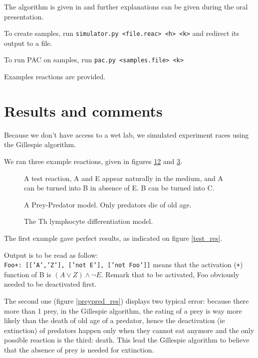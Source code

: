 \documentclass[fontsize=9pt,enabledeprecatedfontcommands]{scrartcl}
\begin{document}
The algorithm is given in \cite{valiant} and further explanations can be given during the oral presentation.

To create samples, run \texttt{simulator.py~<file.reac>~<h>~<k>} and redirect its output to a file.

To run PAC on samples, run \texttt{pac.py~<samples.file>~<k>}

Examples reactions are provided.
\section{Results and comments}
Because we don't have access to a wet lab, we simulated experiment races using the Gillespie algorithm.

We ran three example reactions, given in figures \ref{test}\ref{preypred} and \ref{lympho}.
\begin{figure}[htbp]
	
	\vspace{-1em}
	\caption{A test reaction, A and E appear naturally in the medium, and A can be turned into B in absence of E. B  can be turned into C.\label{test}}
\end{figure}
\begin{figure}[htbp]
	
	\vspace{-1em}
	\caption{A Prey-Predator model. Only predators die of old age.\label{preypred}}
\end{figure}
\begin{figure}[htbp]
	
	\vspace{-1em}
	\caption{The Th lymphocyte differentiation model.\label{lympho}}
\end{figure}

The first example gave perfect results, as indicated on figure \ref{test_res}.

Output is to be read as follow:\\
\texttt{Foo+:~[['A','Z'],~['not~E'],~['not~Foo']]} means that the activation (\texttt{+}) function of B is $(A \vee Z)\wedge\neg E$. Remark that to be activated, Foo obviously needed to be deactivated first.

The second one (figure \ref{preypred_res}) displays two typical error: because there more than 1 prey, in the Gillespie algorithm, the eating of a prey is way more likely than the death of old age of a predator, hence the deactivation (ie extinction) of predators happen only when they cannot eat anymore and the only possible reaction is the third: death. This lead the Gillespie algorithm to believe that the absence of prey is needed for extinction.
\end{document}

